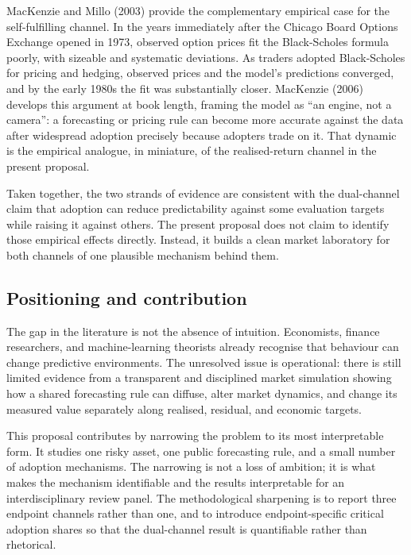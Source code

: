 \documentclass[11pt]{article}
\begin{document}
MacKenzie and Millo (2003) provide the complementary empirical case for the self-fulfilling channel. In the years immediately after the Chicago Board Options Exchange opened in 1973, observed option prices fit the Black-Scholes formula poorly, with sizeable and systematic deviations. As traders adopted Black-Scholes for pricing and hedging, observed prices and the model's predictions converged, and by the early 1980s the fit was substantially closer. MacKenzie (2006) develops this argument at book length, framing the model as ``an engine, not a camera'': a forecasting or pricing rule can become more accurate against the data after widespread adoption precisely because adopters trade on it. That dynamic is the empirical analogue, in miniature, of the realised-return channel in the present proposal.

Taken together, the two strands of evidence are consistent with the dual-channel claim that adoption can reduce predictability against some evaluation targets while raising it against others. The present proposal does not claim to identify those empirical effects directly. Instead, it builds a clean market laboratory for both channels of one plausible mechanism behind them.

\subsection{Positioning and contribution}

The gap in the literature is not the absence of intuition. Economists, finance researchers, and machine-learning theorists already recognise that behaviour can change predictive environments. The unresolved issue is operational: there is still limited evidence from a transparent and disciplined market simulation showing how a shared forecasting rule can diffuse, alter market dynamics, and change its measured value separately along realised, residual, and economic targets.

This proposal contributes by narrowing the problem to its most interpretable form. It studies one risky asset, one public forecasting rule, and a small number of adoption mechanisms. The narrowing is not a loss of ambition; it is what makes the mechanism identifiable and the results interpretable for an interdisciplinary review panel. The methodological sharpening is to report three endpoint channels rather than one, and to introduce endpoint-specific critical adoption shares so that the dual-channel result is quantifiable rather than rhetorical.
\end{document}
